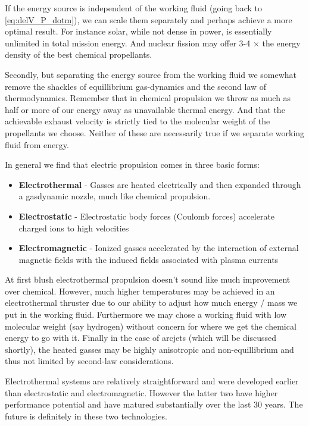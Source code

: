 \documentclass[twocolumn]{memoir} %
\begin{document}
If the energy source is independent of the working fluid (going back to \cref{eq:delV_P_dotm}), we can scale them separately and
perhaps achieve a more optimal result.  For instance solar, while not dense in power, is
essentially unlimited in total mission energy.  And nuclear fission may offer 3-4 $\times$
the energy density of the best chemical propellants.

Secondly, but separating the energy source from the working fluid we somewhat remove the
shackles of equillibrium gas-dynamics and the second law of thermodynamics.  Remember that
in chemical propulsion we throw as much as half or more of our energy away as unavailable 
thermal energy.  And that the achievable exhaust velocity is strictly tied to the molecular
weight of the propellants we choose.  Neither of these are necessarily true if we separate
working fluid from energy.

In general we find that electric propulsion comes in three basic forms:
\begin{itemize}
    \item \textbf{Electrothermal} - Gasses are heated electrically and then expanded through
        a gasdynamic nozzle, much like chemical propulsion.
    \item \textbf{Electrostatic} - Electrostatic body forces (Coulomb forces) accelerate charged
        ions to high velocities
    \item \textbf{Electromagnetic} - Ionized gasses accelerated by the interaction of external
        magnetic fields with the induced fields associated with plasma currents
\end{itemize}

At first blush electrothermal propulsion doesn't sound like much improvement over chemical.  However,
much higher temperatures may be achieved in an electrothermal thruster due to our ability to adjust
how much energy / mass we put in the working fluid.  Furthermore we may chose a working fluid with low
molecular weight (say hydrogen) without concern for where we get the chemical energy to go with it.
Finally in the case of arcjets (which will be discussed shortly), the heated gasses may be highly
anisotropic and non-equillibrium and thus not limited by second-law considerations.

Electrothermal systems are relatively straightforward and were developed earlier than electrostatic and
electromagnetic.  However the latter two have higher performance potential and have matured substantially
over the last 30 years.  The future is definitely in these two technologies.
\end{document}
